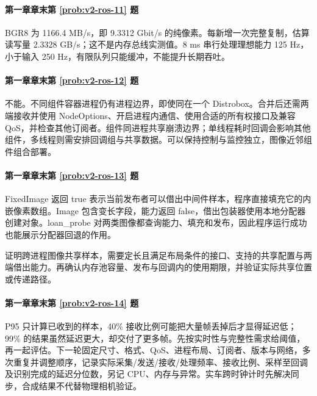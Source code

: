 \paragraph*{第一章章末第 \ref{prob:v2-ros-11} 题}
\begin{solution}
BGR8 为 1166.4 MB/s，即 9.3312 Gbit/s 的纯像素。每新增一次完整复制，估算读写量 2.3328 GB/s；这不是内存总线实测值。8 ms 串行处理理想能力 125 Hz，小于输入 250 Hz，有限队列只能缓冲，不能提升长期吞吐。
\end{solution}

\paragraph*{第一章章末第 \ref{prob:v2-ros-12} 题}
\begin{solution}
不能。不同组件容器进程仍有进程边界，即使同在一个 Distrobox。合并后还需两端接收并使用 NodeOptions、开启进程内通信、使用合适的所有权接口及兼容 QoS，并检查其他订阅者。组件同进程共享崩溃边界；单线程耗时回调会影响其他组件，多线程则需安排回调组与共享数据。可以保持控制与监控独立，图像近邻组件组合部署。
\end{solution}

\paragraph*{第一章章末第 \ref{prob:v2-ros-13} 题}
\begin{solution}
FixedImage 返回 true 表示当前发布者可以借出中间件样本，程序直接填充它的内嵌像素数组。Image 包含变长字段，能力返回 false，借出包装器使用本地分配器创建对象。loan\_probe 对两类图像都查询能力、填充和发布，因此程序运行成功也能展示分配器回退的作用。

证明跨进程图像共享样本，需要定长且满足布局条件的接口、支持的共享配置与两端借出能力。再确认内存池容量、发布与回调内的使用期限，并验证实际共享位置或传递路径。
\end{solution}

\paragraph*{第一章章末第 \ref{prob:v2-ros-14} 题}
\begin{solution}
P95 只计算已收到的样本，40\% 接收比例可能把大量帧丢掉后才显得延迟低；99\% 的结果虽然延迟更大，却交付了更多帧。先按实时性与完整性需求给阈值，再一起评估。下一轮固定尺寸、格式、QoS、进程布局、订阅者、版本与网络，多次重复并调整顺序，记录实际采集/发送/接收/处理频率、接收比例、采样至回调及识别完成的延迟分位数，另记 CPU、内存与异常。实车跨时钟计时先解决同步，合成结果不代替物理相机验证。
\end{solution}

